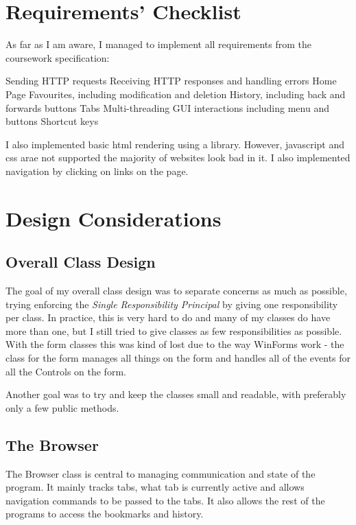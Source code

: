 \documentclass[11pt]{report}
\begin{document}
\chapter{Requirements' Checklist}

As far as I am aware, I managed to implement all requirements from the coursework specification:
\begin{checklist}
	\checkeditem Sending HTTP requests
	\checkeditem Receiving HTTP responses and handling errors
	\checkeditem Home Page
	\checkeditem Favourites, including modification and deletion
	\checkeditem History, including back and forwards buttons
	\checkeditem Tabs
	\checkeditem Multi-threading
	\checkeditem GUI interactions including menu and buttons
	\checkeditem Shortcut keys
\end{checklist}
I also implemented basic html rendering using a library.  However, javascript and css arae not supported the majority of websites look bad in it.  I also implemented navigation by clicking on links on the page.

\chapter{Design Considerations}

\section{Overall Class Design}

The goal of my overall class design was to separate concerns as much as possible, trying enforcing the \textit{Single Responsibility Principal} by giving one responsibility per class.  In practice, this is very hard to do and many of my classes do have more than one, but I still tried to give classes as few responsibilities as possible.  With the form classes this was kind of lost due to the way WinForms work - the class for the form manages all things on the form and handles all of the events  for all the Controls on the form.

Another goal was to try and keep the classes small and readable, with preferably only a few public methods.

\section{The Browser}
The Browser class is central to managing communication and state of the program.  It mainly tracks tabs, what tab is currently active and allows navigation commands to be passed to the tabs.  It also allows the rest of the programs to access the bookmarks and history.
\end{document}
